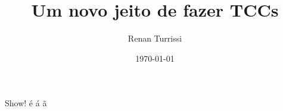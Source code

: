 \documentclass{article}
\author{Renan Turrissi}
\date{\today}
\title{Um novo jeito de fazer TCCs}
\begin{document}
\maketitle

Show! é á ã
\end{document}
